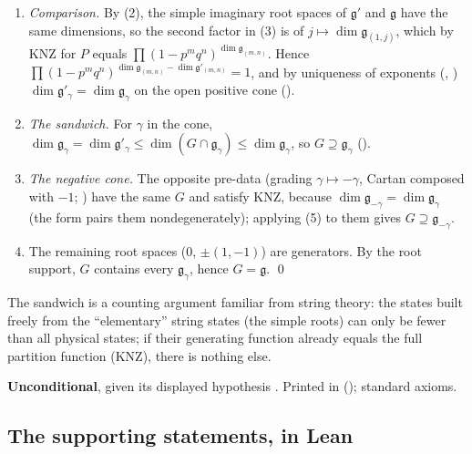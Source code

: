 \begin{enumerate}[label=(\arabic*)]
$\mathfrak{sl}_2$-theory (the imaginary simple root spaces are lowest-weight spaces for the real $\mathfrak{sl}_2$, of weight
$j-1$, so the string has exactly $j$ terms).  A weight $(a,b)$ with $a,b\ge1$ occurs exactly once, for $j=a+b-1$, $k=a-1$.
\item \emph{Comparison.}  By (2), the simple imaginary root spaces of $\mathfrak g'$ and $\mathfrak g$ have the same
  dimensions, so the second factor in (3) is  of $j\mapsto\dim\mathfrak g_{(1,j)}$, which by KNZ for $P$ equals
  $\prod(1-p^mq^n)^{\dim\mathfrak g_{(m,n)}}$.  Hence $\prod(1-p^mq^n)^{\dim\mathfrak g_{(m,n)}-\dim\mathfrak g'_{(m,n)}}=1$, and by
  uniqueness of exponents (, )
  $\dim\mathfrak g'_\gamma=\dim\mathfrak g_\gamma$ on the open positive cone ().
\item \emph{The sandwich.}  For $\gamma$ in the cone, $\dim\mathfrak g_\gamma=\dim\mathfrak g'_\gamma\le\dim(G\cap\mathfrak g_\gamma)\le
  \dim\mathfrak g_\gamma$, so $G\supseteq\mathfrak g_\gamma$ ().
\item \emph{The negative cone.}  The opposite pre-data (grading $\gamma\mapsto-\gamma$, Cartan composed with $-1$;
  ) have the same $G$ and satisfy KNZ, because $\dim\mathfrak g_{-\gamma}=\dim\mathfrak g_\gamma$ (the form pairs
  them nondegenerately); applying (5) to them gives $G\supseteq\mathfrak g_{-\gamma}$.
\item The remaining root spaces ($0$, $\pm(1,-1)$) are generators.  By the root support, $G$ contains every
  $\mathfrak g_\gamma$, hence $G=\mathfrak g$. \qed
\end{enumerate}
\begin{physics}
The sandwich is a counting argument familiar from string theory: the states built freely from the ``elementary'' string
states (the simple roots) can only be fewer than all physical states; if their generating function already equals the
full partition function (KNZ), there is nothing else.
\end{physics}
\begin{status}
\textbf{Unconditional}, given its displayed hypothesis .  Printed in
 (); standard axioms.
\end{status}

\subsection{The supporting statements, in Lean}

